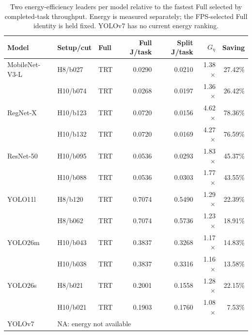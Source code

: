 \begin{table}[t]
\centering
\caption{Two energy-efficiency leaders per model relative to the fastest Full selected by completed-task throughput. Energy is measured separately; the FPS-selected Full identity is held fixed. YOLOv7 has no current energy ranking.}
\label{tab:energy-leaders}
\small
\begin{tabular*}{\textwidth}{@{\extracolsep{\fill}}lllrrrr@{}}
\toprule
Model & Setup/cut & Full & Full J/task & Split J/task & $G_\eta$ & Saving\\
\midrule
MobileNet-V3-L & H8/b027 & TRT & 0.0290 & 0.0210 & 1.38$\times$ & 27.42\%\\
 & H10/b074 & TRT & 0.0268 & 0.0197 & 1.36$\times$ & 26.42\%\\
RegNet-X & H10/b123 & TRT & 0.0720 & 0.0156 & 4.62$\times$ & 78.36\%\\
 & H10/b132 & TRT & 0.0720 & 0.0169 & 4.27$\times$ & 76.59\%\\
ResNet-50 & H10/b095 & TRT & 0.0536 & 0.0293 & 1.83$\times$ & 45.37\%\\
 & H10/b088 & TRT & 0.0536 & 0.0303 & 1.77$\times$ & 43.55\%\\
YOLO11l & H8/b120 & TRT & 0.7074 & 0.5490 & 1.29$\times$ & 22.39\%\\
 & H8/b062 & TRT & 0.7074 & 0.5736 & 1.23$\times$ & 18.91\%\\
YOLO26m & H10/b043 & TRT & 0.3837 & 0.3268 & 1.17$\times$ & 14.83\%\\
 & H10/b038 & TRT & 0.3837 & 0.3316 & 1.16$\times$ & 13.58\%\\
YOLO26s & H8/b021 & TRT & 0.2001 & 0.1558 & 1.28$\times$ & 22.15\%\\
 & H10/b021 & TRT & 0.1903 & 0.1760 & 1.08$\times$ & 7.53\%\\
YOLOv7 & \multicolumn{6}{l}{NA: energy not available}\\
\bottomrule
\end{tabular*}
\end{table}
